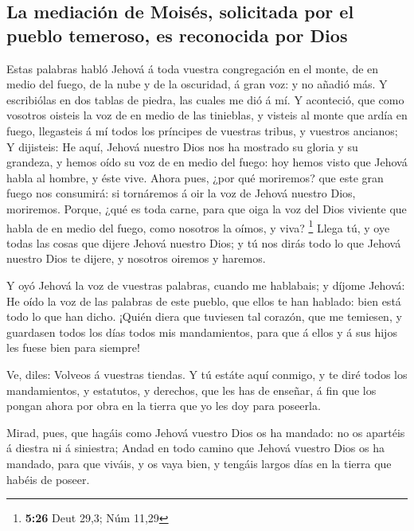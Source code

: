 \hypertarget{la-mediaciuxf3n-de-moisuxe9s-solicitada-por-el-pueblo-temeroso-es-reconocida-por-dios}{%
\subsection{La mediación de Moisés, solicitada por el pueblo temeroso,
es reconocida por
Dios}\label{la-mediaciuxf3n-de-moisuxe9s-solicitada-por-el-pueblo-temeroso-es-reconocida-por-dios}}

 Estas palabras habló Jehová á toda vuestra congregación en
el monte, de en medio del fuego, de la nube y de la oscuridad, á gran
voz: y no añadió más. Y escribiólas en dos tablas de piedra, las cuales
me dió á mí.  Y aconteció, que como vosotros oisteis la voz
de en medio de las tinieblas, y visteis al monte que ardía en fuego,
llegasteis á mí todos los príncipes de vuestras tribus, y vuestros
ancianos;  Y dijisteis: He aquí, Jehová nuestro Dios nos ha
mostrado su gloria y su grandeza, y hemos oído su voz de en medio del
fuego: hoy hemos visto que Jehová habla al hombre, y éste vive.
 Ahora pues, ¿por qué moriremos? que este gran fuego nos
consumirá: si tornáremos á oir la voz de Jehová nuestro Dios, moriremos.
 Porque, ¿qué es toda carne, para que oiga la voz del Dios
viviente que habla de en medio del fuego, como nosotros la oímos, y
viva? \footnote{\textbf{5:26} Deut 29,3; Núm 11,29}  Llega
tú, y oye todas las cosas que dijere Jehová nuestro Dios; y tú nos dirás
todo lo que Jehová nuestro Dios te dijere, y nosotros oiremos y haremos.

 Y oyó Jehová la voz de vuestras palabras, cuando me
hablabais; y díjome Jehová: He oído la voz de las palabras de este
pueblo, que ellos te han hablado: bien está todo lo que han dicho.
 ¡Quién diera que tuviesen tal corazón, que me temiesen, y
guardasen todos los días todos mis mandamientos, para que á ellos y á
sus hijos les fuese bien para siempre!

 Ve, diles: Volveos á vuestras tiendas.  Y tú
estáte aquí conmigo, y te diré todos los mandamientos, y estatutos, y
derechos, que les has de enseñar, á fin que los pongan ahora por obra en
la tierra que yo les doy para poseerla.

 Mirad, pues, que hagáis como Jehová vuestro Dios os ha
mandado: no os apartéis á diestra ni á siniestra;  Andad en
todo camino que Jehová vuestro Dios os ha mandado, para que viváis, y os
vaya bien, y tengáis largos días en la tierra que habéis de poseer.

